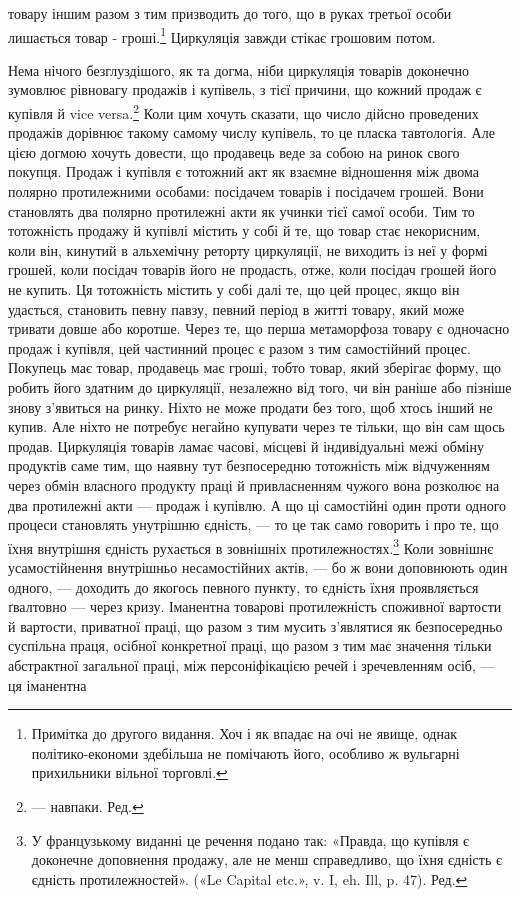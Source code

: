 \parcont{}  %
товару іншим разом з тим призводить до того, що в руках третьої
особи лишається товар - гроші.\footnote{
Примітка до другого видання. Хоч і як впадає на очі не явище,
однак політико-економи здебільша не помічають його, особливо ж вульгарні
прихильники вільної торговлі.
} Циркуляція завжди стікає грошовим
потом.

Нема нічого безглуздішого, як та догма, ніби циркуляція
товарів доконечно зумовлює рівновагу продажів і купівель, з
тієї причини, що кожний продаж є купівля й vice versa.\footnote*{
— навпаки. Ред.
} Коли
цим хочуть сказати, що число дійсно проведених продажів дорівнює
такому самому числу купівель, то це пласка тавтологія.
Але цією догмою хочуть довести, що продавець веде за собою
на ринок свого покупця. Продаж і купівля є тотожний акт як
взаємне відношення між двома полярно протилежними особами:
посідачем товарів і посідачем грошей. Вони становлять два полярно
протилежні акти як учинки тієї самої особи. Тим то тотожність
продажу й купівлі містить у собі й те, що товар стає некорисним,
коли він, кинутий в альхемічну реторту циркуляції, не
виходить із неї у формі грошей, коли посідач товарів його не продасть,
отже, коли посідач грошей його не купить. Ця тотожність
містить у собі далі те, що цей процес, якщо він удасться, становить
певну павзу, певний період в житті товару, який може тривати
довше або коротше. Через те, що перша метаморфоза товару є
одночасно продаж і купівля, цей частинний процес є разом з
тим самостійний процес. Покупець має товар, продавець має
гроші, тобто товар, який зберігає форму, що робить його здатним
до циркуляції, незалежно від того, чи він раніше або пізніше
знову з’явиться на ринку. Ніхто не може продати без того, щоб
хтось інший не купив. Але ніхто не потребує негайно купувати
через те тільки, що він сам щось продав. Циркуляція товарів
ламає часові, місцеві й індивідуальні межі обміну продуктів
саме тим, що наявну тут безпосередню тотожність між відчуженням
через обмін власного продукту праці й привласненням
чужого вона розколює на два протилежні акти — продаж і купівлю.
А що ці самостійні один проти одного процеси становлять
унутрішню єдність, — то це так само говорить і про те, що їхня
внутрішня єдність рухається в зовнішніх протилежностях.\footnote*{
У французькому виданні це речення подано так: «Правда, що купівля
є доконечне доповнення продажу, але не менш справедливо, що
їхня єдність є єдність протилежностей». («Le Capital etc.», v. I, eh. Ill, p. 47).
Ред.
}
Коли зовнішнє усамостійнення внутрішньо несамостійних актів, —
бо ж вони доповнюють один одного, — доходить до якогось певного
пункту, то єдність їхня проявляється ґвалтовно — через
кризу. Іманентна товарові протилежність споживної вартости й
вартости, приватної праці, що разом з тим мусить з’являтися
як безпосередньо суспільна праця, осібної конкретної праці,
що разом з тим має значення тільки абстрактної загальної праці,
між персоніфікацією речей і зречевленням осіб, — ця іманентна
\parbreak{}  %
